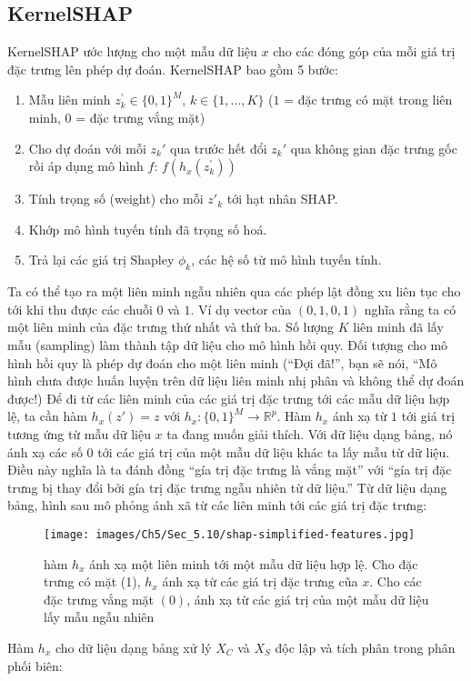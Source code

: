 \begin{enumerate}
\subsection{KernelSHAP}

KernelSHAP ước lượng cho một mẫu dữ liệu $x$ cho các đóng góp của mỗi giá trị đặc trưng lên phép dự đoán. KernelSHAP bao gồm 5 bước:

\begin{enumerate}
    \item Mẫu liên minh $z_k^{'} \in \{ 0, 1\} ^M$, $k \in \{ 1, \dots, K\}$ ($1$ = đặc trưng có mặt trong liên minh, $0$ = đặc trưng vắng mặt)
    \item Cho dự đoán với mỗi $z_k'$ qua trước hết đổi $z_k'$ qua không gian đặc trưng gốc rồi áp dụng mô hình $f$: $f(h_x(z^{'}_k))$
    \item Tính trọng số (weight) cho mỗi $z'_k$ tới hạt nhân SHAP.
    \item Khớp mô hình tuyến tính đã trọng số hoá.
    \item Trả lại các giá trị Shapley $\phi_k$, các hệ số từ mô hình tuyến tính.
\end{enumerate}

Ta có thể tạo ra một liên minh ngẫu nhiên qua các phép lật đồng xu liên tục cho tới khi thu được các chuỗi $0$ và $1$. Ví dụ vector của $(0, 1, 0, 1)$ nghĩa rằng ta có một liên minh của đặc trưng thứ nhất và thứ ba. Số lượng $K$ liên minh đã lấy mẫu (sampling) làm thành tập dữ liệu cho mô hình hồi quy. Đối tượng cho mô hình hồi quy là phép dự đoán cho một liên minh (“Đợi đã!”, bạn sẽ nói, “Mô hình chưa được huấn luyện trên dữ liệu liên minh nhị phân và không thể dự đoán được!) Để đi từ các liên minh của các giá trị đặc trưng tới các mẫu dữ liệu hợp lệ, ta cần hàm $h_x(z') = z$ với $h_x: \{0, 1\}^M \rightarrow \mathbb{R}^p$. Hàm $h_x$ ánh xạ từ $1$ tới giá trị tương ứng từ mẫu dữ liệu $x$ ta đang muốn giải thích. Với dữ liệu dạng bảng, nó ánh xạ các số $0$ tới các giá trị của một mẫu dữ liệu khác ta lấy mẫu từ dữ liệu. Điều này nghĩa là ta đánh đồng “gía trị đặc trưng là vắng mặt” với “gía trị đặc trưng bị thay đổi bởi gía trị đặc trưng ngẫu nhiên từ dữ liệu.” Từ dữ liệu dạng bảng, hình sau mô phỏng ánh xã từ các liên minh tới các giá trị đặc trưng:

\begin{figure*}[h!]
	\centering
	\texttt{[image: images/Ch5/Sec\_5.10/shap-simplified-features.jpg]}
	\label{fig:5_48}
	\caption{hàm $h_x$ ánh xạ một liên minh tới một mẫu dữ liệu hợp lệ. Cho đặc trưng có mặt (1), $h_x$ ánh xạ từ các giá trị đặc trưng cũa $x$. Cho các đặc trưng vắng mặt $(0)$, ánh xạ từ các giá trị của một mẫu dữ liệu lấy mẫu ngẫu nhiên}
\end{figure*}
Hàm $h_x$ cho dữ liệu dạng bảng xử lý $X_C$ và $X_S$ độc lập và tích phân trong phân phối biên:


\end{enumerate}
